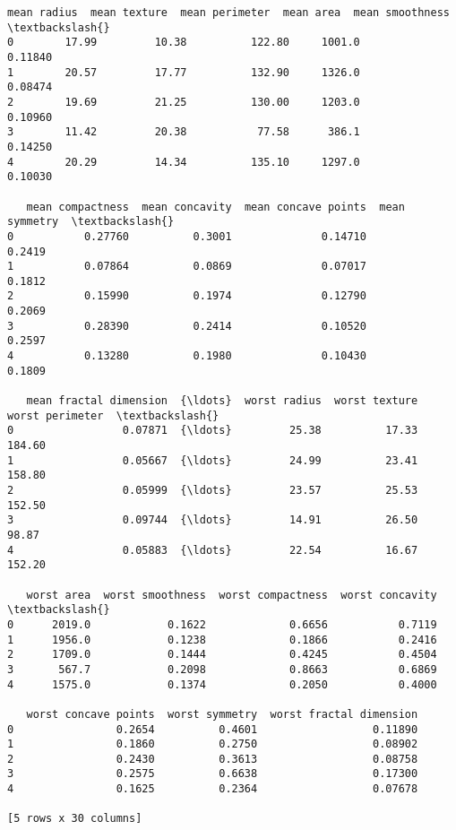 \documentclass[11pt]{article}
\makeatletter
\newcommand{\boxspacing}{\kern\kvtcb@left@rule\kern\kvtcb@boxsep}
\newcommand{\prompt}[4]{
        {\ttfamily\llap{{\color{#2}[#3]:\hspace{3pt}#4}}\vspace{-\baselineskip}}
    }
\makeatother
\begin{document}
            \begin{tcolorbox}[breakable, size=fbox, boxrule=.5pt, pad at break*=1mm, opacityfill=0]
\prompt{Out}{outcolor}{1}{\boxspacing}
\begin{Verbatim}[commandchars=\\\{\}]
   mean radius  mean texture  mean perimeter  mean area  mean smoothness  \textbackslash{}
0        17.99         10.38          122.80     1001.0          0.11840
1        20.57         17.77          132.90     1326.0          0.08474
2        19.69         21.25          130.00     1203.0          0.10960
3        11.42         20.38           77.58      386.1          0.14250
4        20.29         14.34          135.10     1297.0          0.10030

   mean compactness  mean concavity  mean concave points  mean symmetry  \textbackslash{}
0           0.27760          0.3001              0.14710         0.2419
1           0.07864          0.0869              0.07017         0.1812
2           0.15990          0.1974              0.12790         0.2069
3           0.28390          0.2414              0.10520         0.2597
4           0.13280          0.1980              0.10430         0.1809

   mean fractal dimension  {\ldots}  worst radius  worst texture  worst perimeter  \textbackslash{}
0                 0.07871  {\ldots}         25.38          17.33           184.60
1                 0.05667  {\ldots}         24.99          23.41           158.80
2                 0.05999  {\ldots}         23.57          25.53           152.50
3                 0.09744  {\ldots}         14.91          26.50            98.87
4                 0.05883  {\ldots}         22.54          16.67           152.20

   worst area  worst smoothness  worst compactness  worst concavity  \textbackslash{}
0      2019.0            0.1622             0.6656           0.7119
1      1956.0            0.1238             0.1866           0.2416
2      1709.0            0.1444             0.4245           0.4504
3       567.7            0.2098             0.8663           0.6869
4      1575.0            0.1374             0.2050           0.4000

   worst concave points  worst symmetry  worst fractal dimension
0                0.2654          0.4601                  0.11890
1                0.1860          0.2750                  0.08902
2                0.2430          0.3613                  0.08758
3                0.2575          0.6638                  0.17300
4                0.1625          0.2364                  0.07678

[5 rows x 30 columns]
\end{Verbatim}
\end{tcolorbox}
        
\end{document}
